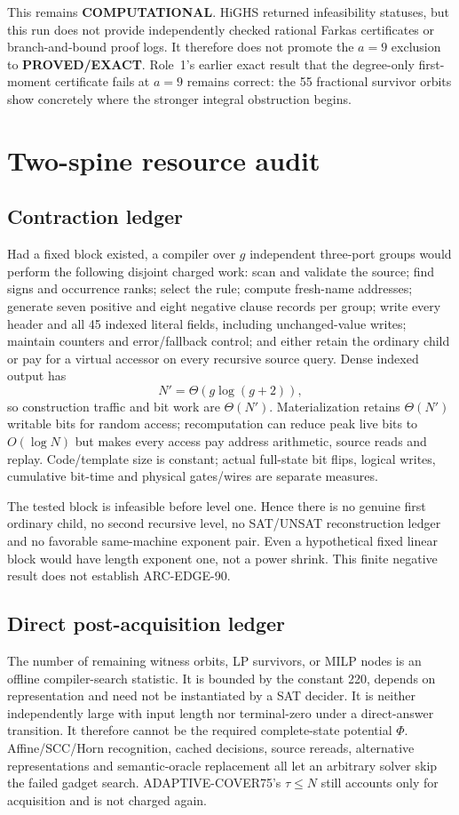 \documentclass[11pt]{article}
\begin{document}
This remains \textbf{COMPUTATIONAL}.  HiGHS returned infeasibility statuses,
but this run does not provide independently checked rational Farkas
certificates or branch-and-bound proof logs.  It therefore does not promote
the $a=9$ exclusion to \textbf{PROVED/EXACT}.  Role~1's earlier exact result
that the degree-only first-moment certificate fails at $a=9$ remains correct:
the 55 fractional survivor orbits show concretely where the stronger integral
obstruction begins.

\section{Two-spine resource audit}
\subsection*{Contraction ledger}
Had a fixed block existed, a compiler over $g$ independent three-port groups
would perform the following disjoint charged work: scan and validate the
source; find signs and occurrence ranks; select the rule; compute fresh-name
addresses; generate seven positive and eight negative clause records per
group; write every header and all 45 indexed literal fields, including
unchanged-value writes; maintain counters and error/fallback control; and
either retain the ordinary child or pay for a virtual accessor on every
recursive source query.  Dense indexed output has
\[
 N'=\Theta(g\log(g+2)),
\]
so construction traffic and bit work are $\Theta(N')$.  Materialization
retains $\Theta(N')$ writable bits for random access; recomputation can reduce
peak live bits to $O(\log N)$ but makes every access pay address arithmetic,
source reads and replay.  Code/template size is constant; actual full-state
bit flips, logical writes, cumulative bit-time and physical gates/wires are
separate measures.

The tested block is infeasible before level one.  Hence there is no genuine
first ordinary child, no second recursive level, no SAT/UNSAT reconstruction
ledger and no favorable same-machine exponent pair.  Even a hypothetical
fixed linear block would have length exponent one, not a power shrink.  This
finite negative result does not establish ARC-EDGE-90.

\subsection*{Direct post-acquisition ledger}
The number of remaining witness orbits, LP survivors, or MILP nodes is an
offline compiler-search statistic.  It is bounded by the constant 220,
depends on representation and need not be instantiated by a SAT decider.
It is neither independently large with input length nor terminal-zero under a
direct-answer transition.  It therefore cannot be the required complete-state
potential $\Phi$.  Affine/SCC/Horn recognition, cached decisions, source
rereads, alternative representations and semantic-oracle replacement all let
an arbitrary solver skip the failed gadget search.  ADAPTIVE-COVER75's
$\tau\le N$ still accounts only for acquisition and is not charged again.
\end{document}
